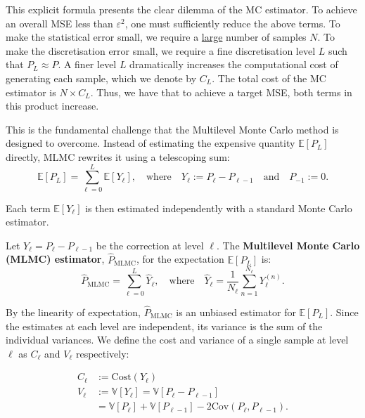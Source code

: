 This explicit formula presents the clear dilemma of the MC estimator. To achieve an overall
MSE less than  $\varepsilon^2$, one must sufficiently reduce the above terms.
To make the statistical error small, we require a \underline{large}
number of samples $N$.
To make the discretisation error small, we require a fine discretisation level $L$ such that
$P_L \approx P$. A finer level $L$ dramatically increases the computational cost 
of generating each sample, which we denote by $C_{L}$. The total cost of the 
MC estimator is $N \times C_L$.
Thus, we have that to achieve a target MSE, both terms in this product increase.

This is the fundamental challenge that the Multilevel Monte Carlo method is designed to overcome. 
Instead of estimating the expensive quantity $\mathbb{E}[P_L]$ directly, MLMC rewrites it 
using a telescoping sum:
\begin{equation*}
    \mathbb{E}[P_L] = \sum_{\ell=0}^L \mathbb{E}[Y_\ell], \quad \text{where} \quad Y_\ell := P_\ell - P_{\ell-1} \quad \text{and} \quad P_{-1} := 0.
\end{equation*}

Each term $\mathbb{E}[Y_\ell]$ is then estimated independently with a standard Monte Carlo estimator.

\begin{definition}\label{def:mlmc_estimator}
    Let $Y_\ell = P_\ell - P_{\ell-1}$ be the correction at level $\ell$. The \textbf{Multilevel Monte Carlo (MLMC) estimator}, $\hat{P}_{\mathrm{MLMC}}$, for the expectation $\mathbb{E}[P_L]$ is:
    \[
    \hat{P}_{\mathrm{MLMC}} = \sum_{\ell=0}^L \hat{Y}_\ell, \quad \text{where} \quad \hat{Y}_\ell = \frac{1}{N_\ell} \sum_{n=1}^{N_\ell} Y_\ell^{(n)}.
    \]
\end{definition}


By the linearity of expectation, $\hat{P}_{\mathrm{MLMC}}$ is an unbiased estimator for 
$\mathbb{E}[P_L]$. Since the estimates at each level are independent, its variance is the sum 
of the individual variances. We define the cost and variance of a single sample at 
level $\ell$ as $C_\ell$ and $V_\ell$ respectively:

\begin{align*}
    C_\ell &:= \text{Cost}(Y_\ell) \\
    V_\ell &:= \mathbb{V}[Y_\ell] = \mathbb{V}[P_\ell - P_{\ell-1}] \\
    &= \mathbb{V}[P_\ell] + \mathbb{V}[P_{\ell - 1}]  - 2 \mathrm{Cov}(P_\ell, P_{\ell - 1}).
\end{align*}

